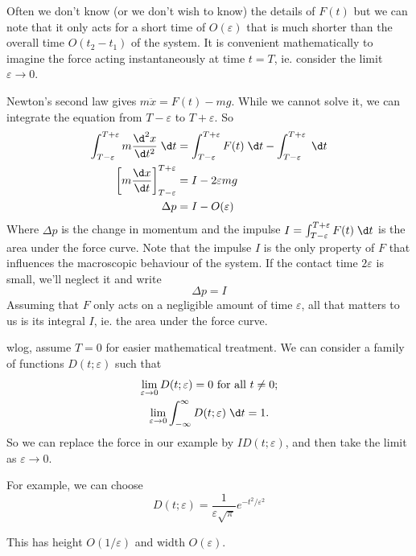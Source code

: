 \documentclass[a4paper]{article}
\begin{document}
Often we don't know (or we don't wish to know) the details of $F(t)$ but we can note that it only acts for a short time of $O(\varepsilon)$ that is much shorter than the overall time $O(t_2 - t_1)$ of the system. It is convenient mathematically to imagine the force acting instantaneously at time $t = T$, ie. consider the limit $\varepsilon\to 0$.

Newton's second law gives $m\ddot x = F(t) - mg$. While we cannot solve it, we can integrate the equation from $T - \varepsilon$ to $T + \varepsilon$. So
\begin{align*}
  \int_{T - \varepsilon}^{T + \varepsilon} m\frac{\d ^2 x}{\d t^2}\;\d t &= \int_{T - \varepsilon}^{T + \varepsilon} F(t)\;\d t - \int_{T - \varepsilon}^{T + \varepsilon}\;\d t\\
  \left[ m\frac{\d x}{\d t}\right]^{T + \varepsilon}_{T - \varepsilon} &= I - 2\varepsilon mg\\
  \Delta p &= I - O(\varepsilon)
\end{align*}
Where $\Delta p$ is the change in momentum and the impulse $I = \int_{T - \varepsilon}^{T + \varepsilon} F(t) \;\d t$ is the area under the force curve. Note that the impulse $I$ is the only property of $F$ that influences the macroscopic behaviour of the system. If the contact time $2\varepsilon$ is small, we'll neglect it and write
\[
  \Delta p = I
\]
Assuming that $F$ only acts on a negligible amount of time $\varepsilon$, all that matters to us is its integral $I$, ie. the area under the force curve.

wlog, assume $T = 0$ for easier mathematical treatment. We can consider a family of functions $D(t; \varepsilon)$ such that
\begin{gather*}
  \lim_{\varepsilon\to 0} D(t; \varepsilon) = 0 \text{ for all }t \not= 0;\\
  \lim_{\varepsilon\to 0}\int_{-\infty}^\infty D(t; \varepsilon) \;\d t = 1.
\end{gather*}
So we can replace the force in our example by $ID(t; \varepsilon)$, and then take the limit as $\varepsilon \to 0$.

For example, we can choose
\[
  D(t; \varepsilon) = \frac{1}{\varepsilon\sqrt{\pi}}e^{-t^2/\varepsilon^2}
\]
\begin{center}
\end{center}
This has height $O(1/\varepsilon)$ and width $O(\varepsilon)$.
\end{document}
